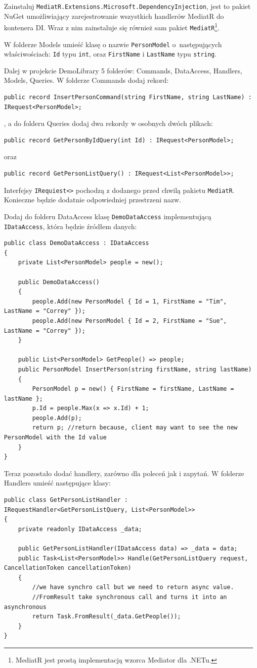 Zainstaluj \texttt{MediatR.Extensions.Microsoft.DependencyInjection}, jest to pakiet NuGet umożliwiający zarejestrowanie wszystkich handlerów MediatR do kontenera DI. Wraz z nim zainstaluje się również sam pakiet \texttt{MediatR}\footnote{MediatR jest prostą implementacją wzorca Mediator dla .NETu.}.

W folderze Models umieść klasę o nazwie \texttt{PersonModel} o~następujących właściwościach: \texttt{Id} typu \texttt{int}, oraz \texttt{FirstName} i \texttt{LastName} typu \texttt{string}.

Dalej w projekcie DemoLibrary 5 folderów: Commands, DataAccess, Handlers, Models, Queries. W folderze Commands dodaj rekord:
\begin{lstlisting}
public record InsertPersonCommand(string FirstName, string LastName) : IRequest<PersonModel>;
\end{lstlisting}
, a do folderu Queries dodaj dwa rekordy w osobnych dwóch plikach:
\begin{lstlisting}
public record GetPersonByIdQuery(int Id) : IRequest<PersonModel>;
\end{lstlisting}
oraz
\begin{lstlisting}
public record GetPersonListQuery() : IRequest<List<PersonModel>>;
\end{lstlisting}
Interfejsy \texttt{IRequiest<>} pochodzą z dodanego przed chwilą pakietu \texttt{MediatR}. Konieczne będzie dodatnie odpowiedniej przestrzeni nazw.

Dodaj do folderu DataAccess klasę \texttt{DemoDataAccess} implementującą \texttt{IDataAccess}, która będzie źródłem danych:
\begin{lstlisting}
public class DemoDataAccess : IDataAccess
{
	private List<PersonModel> people = new();
	
	public DemoDataAccess()
	{
		people.Add(new PersonModel { Id = 1, FirstName = "Tim", LastName = "Correy" });
		people.Add(new PersonModel { Id = 2, FirstName = "Sue", LastName = "Correy" });
	}
	
	public List<PersonModel> GetPeople() => people;
	public PersonModel InsertPerson(string firstName, string lastName)
	{
		PersonModel p = new() { FirstName = firstName, LastName = lastName };
		p.Id = people.Max(x => x.Id) + 1;
		people.Add(p);
		return p; //return because, client may want to see the new PersonModel with the Id value
	}
}
\end{lstlisting}

Teraz pozostało dodać handlery, zarówno dla poleceń jak i zapytań. W folderze Handlers umieść następujące klasy:
\begin{lstlisting}
public class GetPersonListHandler : IRequestHandler<GetPersonListQuery, List<PersonModel>>
{
	private readonly IDataAccess _data;
	
	public GetPersonListHandler(IDataAccess data) => _data = data;
	public Task<List<PersonModel>> Handle(GetPersonListQuery request, CancellationToken cancellationToken)
	{
		//we have synchro call but we need to return async value.
		//FromResult take synchronous call and turns it into an asynchronous 
		return Task.FromResult(_data.GetPeople());
	}
}
\end{lstlisting}

